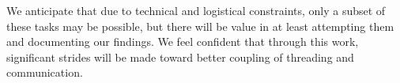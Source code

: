 We anticipate that due to technical and logistical constraints, only a subset of these tasks may be possible, but there will be value in at least attempting them and documenting our findings.  We feel confident that through this work, significant strides will be made toward better coupling of threading and communication.

